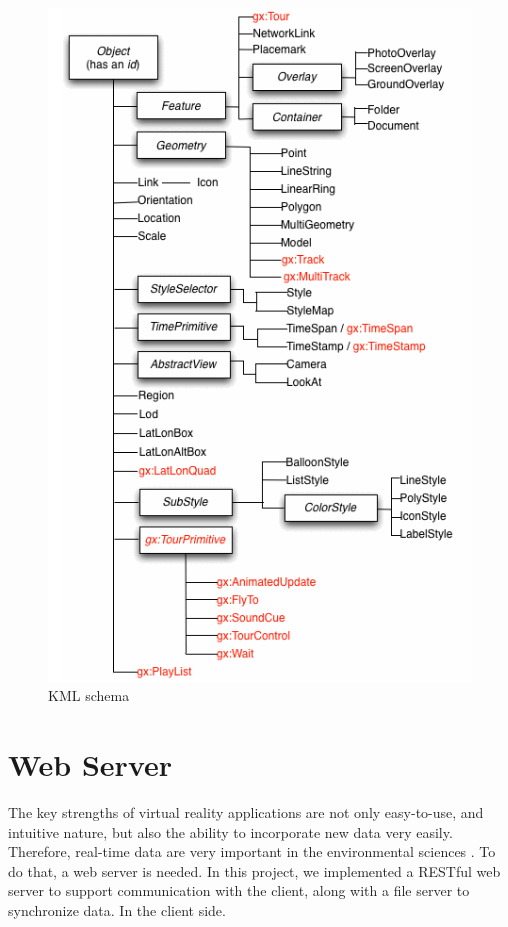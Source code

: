\begin{figure}[H]
\caption[KML schema]{KML schema \cite{google.kml.2016}}
\label{fig:kml-schema}
\centering
\includegraphics[]{Figures/kml-schema.png}
\decoRule
\end{figure}

\section{Web Server}
\label{section:network}

The key strengths of virtual reality applications are not only easy-to-use, and intuitive nature, but also the ability to incorporate new data very easily. Therefore, real-time data are very important in the environmental sciences \cite{blower.sharing-visualizing.2007}. To do that, a web server is needed. In this project, we implemented a RESTful web server to support communication with the client, along with a  file server to synchronize data. In the client side.

